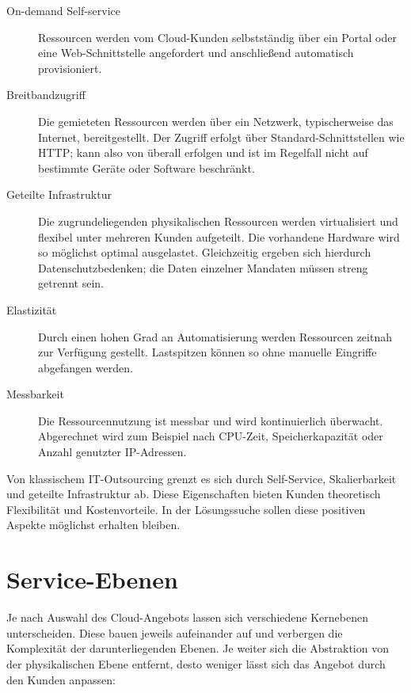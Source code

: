 \begin{description}

	\item[On-demand Self-service] Ressourcen werden vom Cloud-Kunden selbstständig über ein Portal oder eine Web-Schnittstelle angefordert und anschließend automatisch provisioniert.
	
	\item[Breitbandzugriff] Die gemieteten Ressourcen werden über ein Netzwerk, typischerweise das Internet, bereitgestellt. Der Zugriff erfolgt über Standard-Schnittstellen wie HTTP; kann also von überall erfolgen und ist im Regelfall nicht auf bestimmte Geräte oder Software beschränkt.
	
	\item[Geteilte Infrastruktur] Die zugrundeliegenden physikalischen Ressourcen werden virtualisiert und flexibel unter mehreren Kunden aufgeteilt. Die vorhandene Hardware wird so möglichst optimal ausgelastet. Gleichzeitig ergeben sich hierdurch Datenschutzbedenken; die Daten einzelner Mandaten müssen streng getrennt sein.
	
	\item[Elastizität] Durch einen hohen Grad an Automatisierung werden Ressourcen zeitnah zur Verfügung gestellt. Lastspitzen können so ohne manuelle Eingriffe abgefangen werden.

	\item[Messbarkeit] Die Ressourcennutzung ist messbar und wird kontinuierlich überwacht. Abgerechnet wird zum Beispiel nach CPU-Zeit, Speicherkapazität oder Anzahl genutzter IP-Adressen.
	
\end{description}

\noindent Von klassischem IT-Outsourcing grenzt es sich durch Self-Service, Skalierbarkeit und geteilte Infrastruktur ab. Diese Eigenschaften bieten Kunden theoretisch Flexibilität und Kostenvorteile. In der Lösungssuche sollen diese positiven Aspekte möglichst erhalten bleiben.


\section{Service-Ebenen}

Je nach Auswahl des Cloud-Angebots lassen sich verschiedene Kernebenen unterscheiden. Diese bauen jeweils aufeinander auf und verbergen die Komplexität der darunterliegenden Ebenen. Je weiter sich die Abstraktion von der physikalischen Ebene entfernt, desto weniger lässt sich das Angebot durch den Kunden anpassen:

